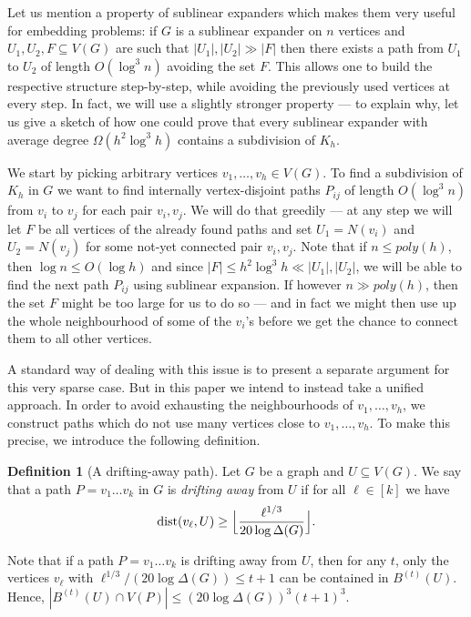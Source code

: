 \documentclass[10pt, a4paper]{article}
\numberwithin{theorem}{section} %
\theoremstyle{remark}
\theoremstyle{definition}
\newtheorem{definition}[theorem]{Definition}
\begin{document}
Let us mention a property of sublinear expanders which makes them very useful for embedding problems: if $G$ is a sublinear expander on $n$ vertices and $U_1, U_2, F \subseteq V(G)$ are such that $|U_1|, |U_2| \gg |F|$ then there exists a path from $U_1$ to $U_2$ of length $O(\log^3 n)$ avoiding the set $F$. This allows one to build the respective structure step-by-step, while avoiding the previously used vertices at every step. In fact, we will use a slightly stronger property --- to explain why, let us give a sketch of how one could prove that every sublinear expander with average degree $\Omega(h^2 \log^3h)$ contains a subdivision of $K_h$.

We start by picking arbitrary vertices $v_1, \dots, v_h \in V(G)$.
To find a subdivision of $K_h$ in $G$ we want to find internally vertex-disjoint paths $P_{ij}$ of length $O(\log^3n)$ from $v_i$ to $v_j$ for each pair $v_i, v_j$.
We will do that greedily --- at any step we will let $F$ be all vertices of the already found paths and set $U_1 = N(v_i)$ and $U_2 = N(v_j)$ for some not-yet connected pair $v_i, v_j$.
Note that if $n \leq poly(h)$, then $\log n \leq O(\log h)$ and since $|F| \leq h^2 \log^3h \ll |U_1|, |U_2|$, we will be able to find the next path $P_{ij}$ using sublinear expansion.
If however $n \gg poly(h)$, then the set $F$ might be too large for us to do so --- and in fact we might then use up the whole neighbourhood of some of the $v_i$'s before we get the chance to connect them to all other vertices.

A standard way of dealing with this issue is to present a separate argument for this very sparse case. But in this paper we intend to instead take a unified approach. In order to avoid exhausting the neighbourhoods of $v_1, \dots, v_h$, we construct paths which do not use many vertices close to $v_1, \dots, v_h$. To make this precise, we introduce the following definition.

\begin{definition}[A drifting-away path]
    Let $G$ be a graph and $U \subseteq V(G)$.
    We say that a path $P = v_1\dots v_k$ in $G$ is \textit{drifting away} from $U$ if for all $\ell \in [k]$ we have
    \[
        {\rm dist}(v_{\ell}, U) \geq \Big\lfloor \frac{\ell^{1/3}}{20 \log \Delta(G)} \Big\rfloor.
    \]
\end{definition}

Note that if a path $P=v_1 \dots v_k$ is drifting away from $U$, then for any $t$, only the vertices $v_\ell$ with $\ell^{1/3}/(20\log \Delta(G))\leq t+1$ can be contained in $B^{(t)}(U)$. Hence, $|B^{(t)}(U)\cap V(P)|\leq (20\log \Delta(G))^3 (t+1)^3$.
\end{document}
